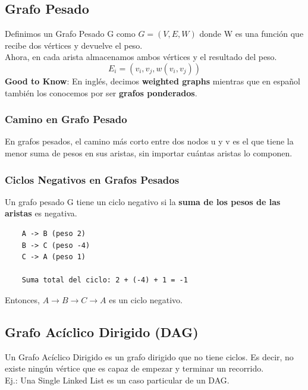 \documentclass[10pt,a4paper]{article}
\begin{document}
\subsection*{Grafo Pesado}
Definimos un Grafo Pesado G como $G = (V, E, W)$ donde W es una función que recibe dos vértices y devuelve el peso. \\
Ahora, en cada arista almacenamos ambos vértices y el resultado del peso. 
\[E_{i} = (v_{i}, v_{j}, w(v_{i},v_{j}))\]
\textbf{Good to Know}: En inglés, decimos \textbf{weighted graphs} mientras que en español también los conocemos por ser \textbf{grafos ponderados}.
\subsubsection*{Camino en Grafo Pesado}
En grafos pesados, el camino más corto entre dos nodos u y v es el que tiene la menor suma de pesos en sus aristas, sin importar cuántas aristas lo componen.
\subsubsection*{Ciclos Negativos en Grafos Pesados}
Un grafo pesado G tiene un ciclo negativo si la \textbf{suma de los pesos de las aristas} es negativa. 
\begin{lstlisting}
    A -> B (peso 2)
    B -> C (peso -4)
    C -> A (peso 1)

    Suma total del ciclo: 2 + (-4) + 1 = -1
\end{lstlisting}
Entonces, $ A \rightarrow B \rightarrow C \rightarrow A$ es un ciclo negativo.
\subsection*{Grafo Acíclico Dirigido (DAG)}
Un Grafo Acíclico Dirigido es un grafo dirigido que no tiene ciclos. Es decir, no existe ningún vértice que es capaz de empezar y terminar un recorrido. \\
Ej.: Una Single Linked List es un caso particular de un DAG.
\end{document}
